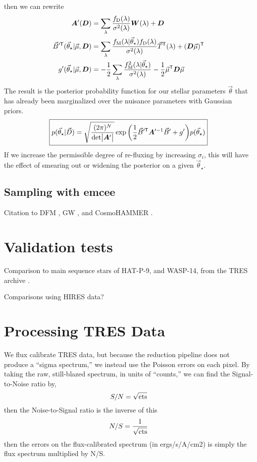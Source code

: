 \documentclass[preprint]{aastex} %
\newcommand{\vt}{\vec{\theta}}
\newcommand{\vstar}{\vt_{\star}}
\newcommand{\fM}{f_{\rm M}}
\newcommand{\fD}{f_{\rm D}}
\newcommand{\vD}{\vec{D}}
\newcommand{\trans}{\mathsf{T}}
\begin{document}
then we can rewrite
\begin{align}
  {\bm A}^\prime({\bm D}) &= \sum_\lambda \frac{\fD(\lambda)}{\sigma^2(\lambda)} {\bm W}(\lambda) + {\bm D}\\
  \vec{B}^{\prime\trans}(\vstar | \vec{\mu}, {\bm D}) &= \sum_\lambda \frac{\fM(\lambda | \vstar) \fD(\lambda)}{\sigma^2(\lambda)} \vec{T}^\trans(\lambda) + ({\bm D} \vec{\mu})^\trans \\
  g^\prime(\vstar | \vec{\mu}, {\bm D}) &= -\frac{1}{2} \sum_\lambda \frac{\fM^2(\lambda|\vstar)}{\sigma^2(\lambda)}- \frac{1}{2} \vec{\mu}^\trans {\bm D} \vec{\mu}\\
\end{align}
The result is the posterior probability function for our stellar parameters $\vt$ that has already been marginalized over the nuisance parameters with Gaussian priors.
\begin{equation}
  \boxed{
  p(\vstar | \vD) = \sqrt{\frac{(2 \pi )^N}{ {\rm det} \bigl |{\bm A}^\prime \bigr |}} \exp{ \left ( \frac{1}{2} \vec{B}^{\prime\trans} {\bm A}^{\prime -1} \vec{B}^\prime + g^\prime \right )} p(\vstar)
}
\end{equation}
If we increase the permissible degree of re-fluxing by increasing $\sigma_i$, this will have the effect of smearing out or widening the posterior on a given $\vstar$.

\subsection{Sampling with emcee}
Citation to DFM \citep{fhl+12}, GW \citep{gw10}, and CosmoHAMMER \citep{asa+13}.

\section{Validation tests}
Comparison to main sequence stars of HAT-P-9, and WASP-14, from the TRES archive \citep{tfs+12}.

Comparisons using HIRES data?

\section{Processing TRES Data}
We flux calibrate TRES data, but because the reduction pipeline does not produce a ``sigma spectrum,'' we instead use the Poisson errors on each pixel. By taking the raw, still-blazed spectrum, in units of ``counts,'' we can find the Signal-to-Noise ratio by,
\begin{equation}
  S/N = \sqrt{ {\rm cts}}
\end{equation}
then the Noise-to-Signal ratio is the inverse of this
\begin{equation}
  N/S = \frac{1}{\sqrt{ {\rm cts}}}
\end{equation}
then the errors on the flux-calibrated spectrum (in ergs/s/A/cm2) is simply the flux spectrum multiplied by N/S. 
\end{document}
